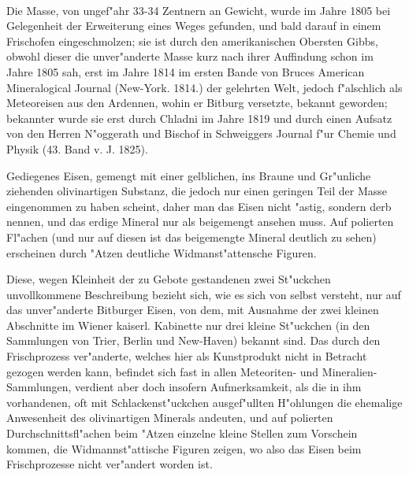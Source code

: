 \documentclass[a4paper, 11pt, oneside, polutonikogreek, german]{article}
\begin{document}
\paragraph{}
Die Masse, von ungef"ahr 33-34 Zentnern an Gewicht, wurde im Jahre 1805 bei Gelegenheit der Erweiterung eines Weges gefunden, und bald darauf in einem Frischofen eingeschmolzen; sie ist durch den amerikanischen Obersten Gibbs, obwohl dieser die unver"anderte Masse kurz nach ihrer Auffindung schon im Jahre 1805 sah, erst im Jahre 1814 im ersten Bande von Bruces American Mineralogical Journal (New-York. 1814.) der gelehrten Welt, jedoch f"alschlich als Meteoreisen aus den Ardennen, wohin er Bitburg versetzte, bekannt geworden; bekannter wurde sie erst durch Chladni im Jahre 1819 und durch einen Aufsatz von den Herren N"oggerath und Bischof in Schweiggers Journal f"ur Chemie und Physik (43. Band v. J. 1825).

Gediegenes Eisen, gemengt mit einer gelblichen, ins Braune und Gr"unliche ziehenden olivinartigen Substanz, die jedoch nur einen geringen Teil der Masse eingenommen zu haben scheint, daher man das Eisen nicht "astig, sondern derb nennen, und das erdige Mineral nur als beigemengt ansehen muss. Auf polierten Fl"achen (und nur auf diesen ist das beigemengte Mineral deutlich zu sehen) erscheinen durch "Atzen deutliche Widmanst"attensche Figuren.

\setlength{\leftskip}{10mm}
\setlength{\parindent}{0pt}

{\footnotesize Diese, wegen Kleinheit der zu Gebote gestandenen zwei St"uckchen unvollkommene Beschreibung bezieht sich, wie es sich von selbst versteht, nur auf das unver"anderte Bitburger Eisen, von dem, mit Ausnahme der zwei kleinen Abschnitte im Wiener kaiserl. Kabinette nur drei kleine St"uckchen (in den Sammlungen von Trier, Berlin und New-Haven) bekannt sind. Das durch den Frischprozess ver"anderte, welches hier als Kunstprodukt nicht in Betracht gezogen werden kann, befindet sich fast in allen Meteoriten- und Mineralien-Sammlungen, verdient aber doch insofern Aufmerksamkeit, als die in ihm vorhandenen, oft mit Schlackenst"uckchen ausgef"ullten H"ohlungen die ehemalige Anwesenheit des olivinartigen Minerals andeuten, und auf polierten Durchschnittsfl"achen beim "Atzen einzelne kleine Stellen zum Vorschein kommen, die Widmannst"attische Figuren zeigen, wo also das Eisen beim Frischprozesse nicht ver"andert worden ist.}

\setlength{\leftskip}{0pt}
\setlength{\parindent}{20pt}
\end{document}
